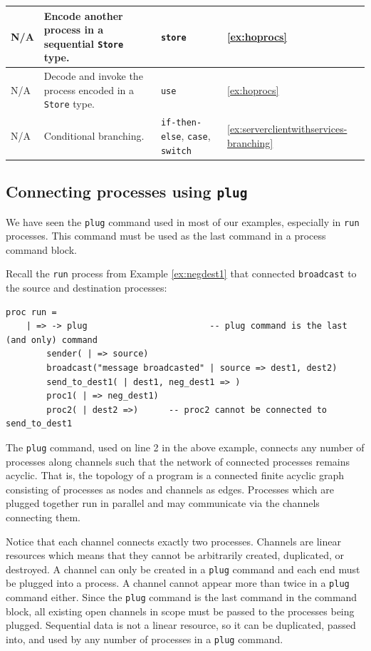 \documentclass[acmsmall]{acmart}
\begin{document}
\begin{table}[!ht]
\begin{tabular}{ | p{2.8cm} | p{6cm} | p{2cm} | p{1.3cm} | }
		 \hline
		  N/A & Encode another process in a sequential \lstinline$Store$ type. & \lstinline$store$ & \ref{ex:hoprocs} \\
		 \hline
		  N/A & Decode and invoke the process \newline encoded in a \lstinline$Store$ type. & \lstinline$use$ & \ref{ex:hoprocs} \\
		 \hline
		  N/A & Conditional branching. & \lstinline$if-then-else$, \lstinline$case$, \lstinline$switch$ & \ref{ex:serverclientwithservices-branching}\\
		 \hline
	\end{tabular}
\end{table}

\subsection{Connecting processes using \lstinline$plug$}

We have seen the \lstinline$plug$ command used in most of our examples, especially in \lstinline$run$ processes.
This command must be used as the last command in a process command block.

Recall the \lstinline$run$ process from Example \ref{ex:negdest1} that connected \lstinline$broadcast$ to the source and destination processes:
\begin{lstlisting}
proc run =
	| => -> plug						-- plug command is the last (and only) command
		sender( | => source)
		broadcast("message broadcasted" | source => dest1, dest2)
		send_to_dest1( | dest1, neg_dest1 => )
		proc1( | => neg_dest1)				
		proc2( | dest2 =>)		-- proc2 cannot be connected to send_to_dest1
\end{lstlisting}	
The \lstinline$plug$ command, used on line 2 in the above example, connects any number of processes along channels such that the network of connected processes remains acyclic.
That is, the topology of a program is a connected finite acyclic graph consisting of processes as nodes and channels as edges.
Processes which are plugged together run in parallel and may communicate via the channels connecting them. 

Notice that each channel connects exactly two processes.
Channels are linear resources which means that they cannot be arbitrarily created, duplicated, or destroyed.
A channel can only be created in a \lstinline$plug$ command and each end must be plugged into a process.
A channel cannot appear more than twice in a \lstinline$plug$ command either.
Since the \lstinline$plug$ command is the last command in the command block, all existing open channels in scope must be passed to the processes being plugged.
Sequential data is not a linear resource, so it can be duplicated, passed into, and used by any number of processes in a \lstinline$plug$ command.
\end{document}
